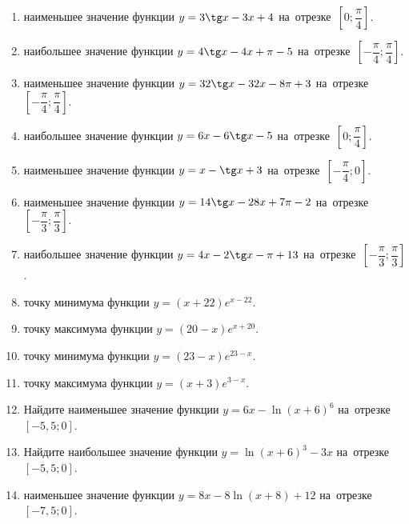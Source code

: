 \documentclass[a4paper,10pt]{article}
\begin{document}
\begin{enumerate}
\item {} наименьшее значение функции $y=3\tg x-3x+4$ на~отрезке~$\left[0;\dfrac{\pi }{4}\right]$.

\item {} наибольшее значение функции $y=4\tg x-4x+\pi -5$ на~отрезке~$\left[-\dfrac{\pi }{4};\dfrac{\pi }{4}\right]$.

\item {} наименьшее значение функции $y=32\tg x-32x-8\pi +3$ на~отрезке~$\left[-\dfrac{\pi }{4};\dfrac{\pi }{4}\right]$.

\item {} наибольшее значение функции $y=6x-6\tg x-5$ на~отрезке~$\left[0;\dfrac{\pi }{4}\right]$.

\item {} наименьшее значение функции $y=x-\tg x+3$ на~отрезке~$\left[-\dfrac{\pi }{4};0\right]$.

\item {} наименьшее значение функции $y=14\tg x-28x+7\pi -2$ на~отрезке~$\left[-\dfrac{\pi }{3};\dfrac{\pi }{3}\right]$.

\item {} наибольшее значение функции $y=4x-2\tg x-\pi +13$ на~отрезке~$\left[-\dfrac{\pi }{3};\dfrac{\pi }{3}\right]$.

\item {} точку минимума функции $y=\left(x+22\right)e^{x-22}$.

\item {} точку максимума функции $y=\left(20-x\right)e^{x+20}$.

\item {} точку минимума функции $y=\left(23-x\right)e^{23-x}$.

\item {} точку максимума функции $y=\left(x+3\right)e^{3-x}$.

\item Найдите наименьшее значение функции $y=6x-\ln \left(x+6\right)^6$ на~отрезке~$\left[-5,5;0\right]$.

\item Найдите наибольшее значение функции $y=\ln \left(x+6\right)^3-3x$ на~отрезке~$\left[-5,5;0\right]$.

\item {} наименьшее значение функции $y=8x-8\ln \left(x+8\right)+12$ на~отрезке~$\left[-7,5;0\right]$.


\end{enumerate}
\end{document}
